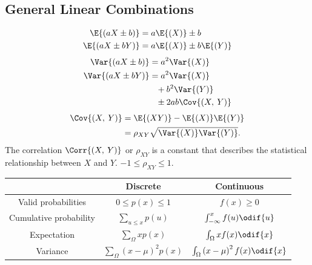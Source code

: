 \documentclass{article}
\begin{document}
\begin{minipage}{126.1962963mm}
\begin{multicols}{2}
        \subsection*{General Linear Combinations}
        \begin{align*}
            \E{\left( aX\pm b \right)}  & = a\E{\left( X \right)} \pm b                     \\
            \E{\left( aX\pm bY \right)} & = a\E{\left( X \right)} \pm b\E{\left( Y \right)}
        \end{align*}
        \begin{align*}
            \Var{\left( aX\pm b \right)}  & = a^2\Var{\left( X \right)}                    \\
            \Var{\left( aX\pm bY \right)} & = a^2\Var{\left( X \right)}                    \\
                                          & \phantom{=} + b^2\Var{\left( Y \right)}        \\
                                          & \phantom{=} \pm 2ab\Cov{\left( X,\: Y \right)}
        \end{align*}
        \begin{align*}
            \Cov{\left( X,\: Y \right)} & = \E{\left( XY \right)} - \E{\left( X \right)}\E{\left( Y \right)} \\
                                        & = \rho_{XY} \sqrt{\Var{\left( X \right)}\Var{\left( Y \right)}}.
        \end{align*}
        The correlation \(\Corr{\left( X,\: Y \right)}\) or \(\rho_{XY}\) is a constant that describes the statistical relationship
        between \(X\) and \(Y\). \(-1 \leq \rho_{XY} \leq 1\).
    \end{multicols}
    \begin{table}[H]
        \centering
        \begin{tabular}{c c c}
            \toprule
                                   & \textbf{Discrete}                              & \textbf{Continuous}                                    \\
            \midrule
            Valid probabilities    & \(0 \leq p(x) \leq 1\)                         & \(f(x) \geq 0\)                                        \\
            Cumulative probability & \(\sum_{u \leq x} p(u)\)                       & \(\int_{-\infty}^{x} f(u) \odif{u}\)                   \\
            Expectation            & \(\sum_{\Omega} xp(x)\)                        & \(\int_{\Omega} xf(x)\odif{x}\)                        \\
            Variance               & \(\sum_{\Omega} \left( x - \mu \right)^2p(x)\) & \(\int_{\Omega} \left( x - \mu \right)^2f(x)\odif{x}\) \\
            \bottomrule
        \end{tabular}
    \end{table}
\end{minipage}\hfill%
\end{document}
